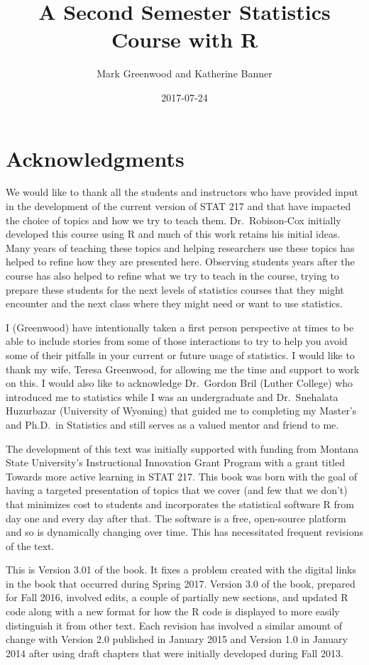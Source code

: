 \documentclass[]{book}
\title{A Second Semester Statistics Course with R}
\author{Mark Greenwood and Katherine Banner}
\date{2017-07-24}
\theoremstyle{definition}
\theoremstyle{definition}
\theoremstyle{remark}
\begin{document}
\maketitle

{
\setcounter{tocdepth}{1}
\tableofcontents
}
\chapter*{Acknowledgments}\label{acknowledgments}

We would like to thank all the students and instructors who have
provided input in the development of the current version of STAT 217 and
that have impacted the choice of topics and how we try to teach them.
Dr.~Robison-Cox initially developed this course using R and much of this
work retains his initial ideas. Many years of teaching these topics and
helping researchers use these topics has helped to refine how they are
presented here. Observing students years after the course has also
helped to refine what we try to teach in the course, trying to prepare
these students for the next levels of statistics courses that they might
encounter and the next class where they might need or want to use
statistics.

I (Greenwood) have intentionally taken a first person perspective at
times to be able to include stories from some of those interactions to
try to help you avoid some of their pitfalls in your current or future
usage of statistics. I would like to thank my wife, Teresa Greenwood,
for allowing me the time and support to work on this. I would also like
to acknowledge Dr.~Gordon Bril (Luther College) who introduced me to
statistics while I was an undergraduate and Dr.~Snehalata Huzurbazar
(University of Wyoming) that guided me to completing my Master's and
Ph.D.~in Statistics and still serves as a valued mentor and friend to
me.

The development of this text was initially supported with funding from
Montana State University's Instructional Innovation Grant Program with a
grant titled Towards more active learning in STAT 217. This book was
born with the goal of having a targeted presentation of topics that we
cover (and few that we don't) that minimizes cost to students and
incorporates the statistical software R from day one and every day after
that. The software is a free, open-source platform and so is dynamically
changing over time. This has necessitated frequent revisions of the
text.

This is Version 3.01 of the book. It fixes a problem created with the
digital links in the book that occurred during Spring 2017. Version 3.0
of the book, prepared for Fall 2016, involved edits, a couple of
partially new sections, and updated R code along with a new format for
how the R code is displayed to more easily distinguish it from other
text. Each revision has involved a similar amount of change with Version
2.0 published in January 2015 and Version 1.0 in January 2014 after
using draft chapters that were initially developed during Fall 2013.
\end{document}
